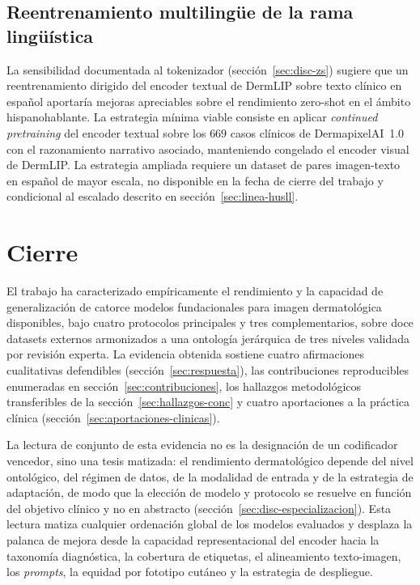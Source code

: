 \subsection{Reentrenamiento multilingüe de la rama lingüística}
\label{sec:linea-multilingual}

La sensibilidad documentada al tokenizador
(sección~\ref{sec:disc-zs}) sugiere que un reentrenamiento dirigido del
encoder textual de DermLIP sobre texto clínico en español aportaría
mejoras apreciables sobre el rendimiento zero-shot en el ámbito
hispanohablante. La estrategia mínima viable consiste en aplicar
\emph{continued pretraining} del encoder textual sobre los
$669$ casos clínicos de DermapixelAI~1.0 con el razonamiento
narrativo asociado, manteniendo congelado el encoder visual de
DermLIP. La estrategia ampliada requiere un dataset de pares
imagen-texto en español de mayor escala, no disponible en la fecha
de cierre del trabajo y condicional al escalado descrito en
sección~\ref{sec:linea-husll}.

\section{Cierre}
\label{sec:cierre}

El trabajo ha caracterizado empíricamente el rendimiento y la
capacidad de generalización de catorce modelos fundacionales para
imagen dermatológica disponibles, bajo cuatro protocolos
principales y tres complementarios, sobre doce datasets externos
armonizados a una ontología jerárquica de tres niveles validada
por revisión experta. La evidencia obtenida sostiene cuatro
afirmaciones cualitativas defendibles (sección~\ref{sec:respuesta}),
las contribuciones reproducibles enumeradas en
sección~\ref{sec:contribuciones}, los hallazgos metodológicos
transferibles de la sección~\ref{sec:hallazgos-conc} y cuatro
aportaciones a la práctica clínica
(sección~\ref{sec:aportaciones-clinicas}).

La lectura de conjunto de esta evidencia no es la designación de un
codificador vencedor, sino una tesis matizada: el rendimiento
dermatológico depende del nivel ontológico, del régimen de datos,
de la modalidad de entrada y de la estrategia de adaptación, de modo
que la elección de modelo y protocolo se resuelve en función del
objetivo clínico y no en abstracto
(sección~\ref{sec:disc-especializacion}). Esta lectura matiza
cualquier ordenación global de los modelos evaluados y desplaza la
palanca de mejora desde la capacidad representacional del encoder
hacia la taxonomía diagnóstica, la cobertura de etiquetas, el
alineamiento texto-imagen, los \emph{prompts}, la equidad por
fototipo cutáneo y la estrategia de despliegue.

